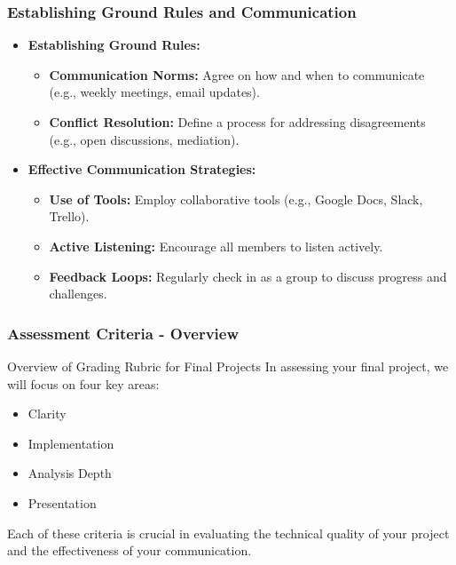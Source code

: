 \documentclass[aspectratio=169]{beamer}
\begin{document}
\begin{frame}[fragile]
    \frametitle{Establishing Ground Rules and Communication}
    \begin{itemize}
        \item \textbf{Establishing Ground Rules:}
        \begin{itemize}
            \item \textbf{Communication Norms:} Agree on how and when to communicate (e.g., weekly meetings, email updates).
            \item \textbf{Conflict Resolution:} Define a process for addressing disagreements (e.g., open discussions, mediation).
        \end{itemize}
        
        \item \textbf{Effective Communication Strategies:}
        \begin{itemize}
            \item \textbf{Use of Tools:} Employ collaborative tools (e.g., Google Docs, Slack, Trello).
            \item \textbf{Active Listening:} Encourage all members to listen actively.
            \item \textbf{Feedback Loops:} Regularly check in as a group to discuss progress and challenges.
        \end{itemize}
    \end{itemize}
\end{frame}

\begin{frame}[fragile]
    \frametitle{Assessment Criteria - Overview}
    \begin{block}{Overview of Grading Rubric for Final Projects}
        In assessing your final project, we will focus on four key areas:
        \begin{itemize}
            \item Clarity
            \item Implementation
            \item Analysis Depth
            \item Presentation
        \end{itemize}
        Each of these criteria is crucial in evaluating the technical quality of your project and the effectiveness of your communication.
    \end{block}
\end{frame}
\end{document}

